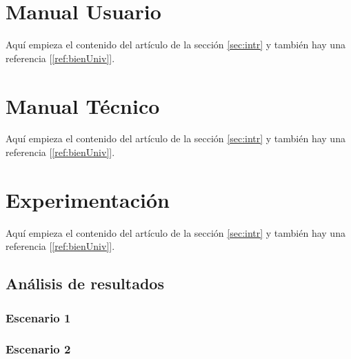 \documentclass{article}
\begin{document}

\section{Manual Usuario}\label{sec:man_u}
Aquí empieza el contenido del artículo de la sección \ref{sec:intr} y también hay una referencia [\ref{ref:bienUniv}].



\section{Manual Técnico}\label{sec:man_t}
Aquí empieza el contenido del artículo de la sección \ref{sec:intr} y también hay una referencia [\ref{ref:bienUniv}].



\section{Experimentación}\label{sec:exp}
Aquí empieza el contenido del artículo de la sección \ref{sec:intr} y también hay una referencia [\ref{ref:bienUniv}].

\subsection{Análisis de resultados}

\subsubsection{Escenario 1}

\subsubsection{Escenario 2}
\end{document}
